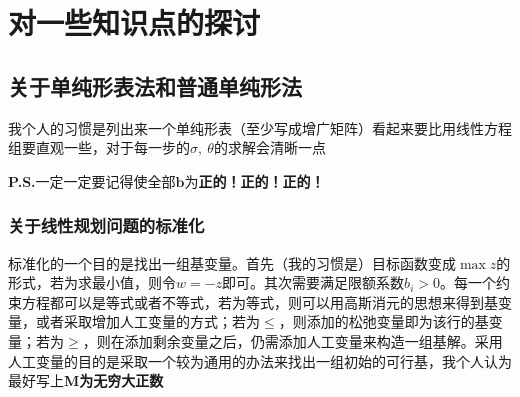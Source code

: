 \documentclass[]{report}
\begin{document}
	\newpage

	\chapter{对一些知识点的探讨}
	\section{关于单纯形表法和普通单纯形法}
	我个人的习惯是列出来一个单纯形表（至少写成增广矩阵）看起来要比用线性方程组要直观一些，对于每一步的$\sigma,\ \theta$的求解会清晰一点\par
	\textbf{P.S.}一定一定要记得使全部$\boldsymbol{b}$为\textbf{正的！正的！正的！}
		\subsection{关于线性规划问题的标准化}
		标准化的一个目的是找出一组基变量。首先（我的习惯是）目标函数变成$\max z$的形式，若为求最小值，则令$w=-z$即可。其次需要满足限额系数$b_i>0$。每一个约束方程都可以是等式或者不等式，若为等式，则可以用高斯消元的思想来得到基变量，或者采取增加人工变量的方式；若为$\le$，则添加的松弛变量即为该行的基变量；若为$\ge$，则在添加剩余变量之后，仍需添加人工变量来构造一组基解。采用人工变量的目的是采取一个较为通用的办法来找出一组初始的可行基，我个人认为最好写上\textbf{M为无穷大正数}
\end{document}
